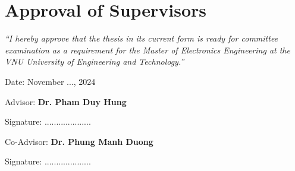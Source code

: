 \chapter*{Approval of Supervisors}

\textit{``I hereby approve that the thesis in its current form is ready for committee examination as a requirement for the Master of Electronics Engineering at the VNU University of Engineering and Technology.''}
\vspace{1cm}

\begin{flushleft}
    Date: November ..., 2024\quad\par

    Advisor: \textbf{Dr. Pham Duy Hung}
    
    \vspace{0.5cm}
    Signature: ....................

    Co-Advisor: \textbf{Dr. Phung Manh Duong}

    \vspace{0.5cm}
    Signature: ....................
\end{flushleft}